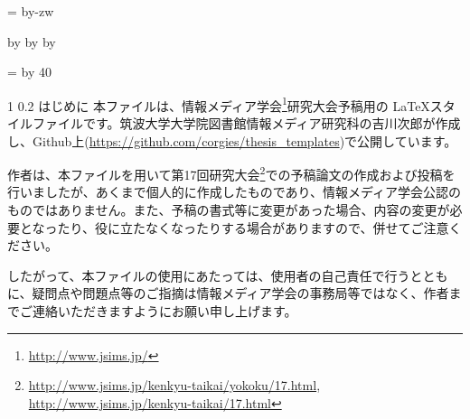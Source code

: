 \documentclass[10pt, a4paper,twocolumn]{jarticle}
\makeatletter
\def\mojiparline#1{
\newcounter{mpl}
\setcounter{mpl}{#1}
\@tempdima=\linewidth
\advance\@tempdima by-\value{mpl}zw
\addtocounter{mpl}{-1}
\divide\@tempdima by \value{mpl}
\advance\kanjiskip by\@tempdima
\advance\parindent by\@tempdima
}
\def\linesparpage#1{
\baselineskip=\textheight
\divide\baselineskip by #1
}
\def\section{\@startsection{section}{1}{\z@}%
{1\Cvs}%
{0.2\Cvs} %
{\reset@font\noindent\normalsize\bfseries}}
\makeatother
\begin{document}
\mojiparline{22} %
\linesparpage{40} %


\section{はじめに}
本ファイルは、情報メディア学会\footnote{\url{http://www.jsims.jp/}}研究大会予稿用の \LaTeX スタイルファイルです。筑波大学大学院図書館情報メディア研究科の吉川次郎が作成し、Github上(\url{https://github.com/corgies/thesis_templates})で公開しています。

作者は、本ファイルを用いて第17回研究大会\footnote{\url{http://www.jsims.jp/kenkyu-taikai/yokoku/17.html}, \url{http://www.jsims.jp/kenkyu-taikai/17.html}}での予稿論文の作成および投稿を行いましたが、あくまで個人的に作成したものであり、情報メディア学会公認のものではありません。また、予稿の書式等に変更があった場合、内容の変更が必要となったり、役に立たなくなったりする場合がありますので、併せてご注意ください。

したがって、本ファイルの使用にあたっては、使用者の自己責任で行うとともに、疑問点や問題点等のご指摘は情報メディア学会の事務局等ではなく、作者までご連絡いただきますようにお願い申し上げます。
\end{document}
